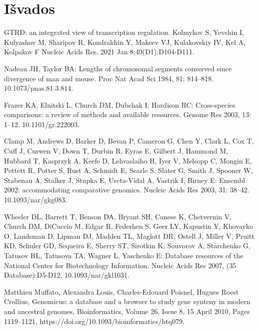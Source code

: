 \documentclass[12pt]{article}
\begin{document}
\newpage


\section{Išvados}

\newpage



\begin{thebibliography}{99}

 GTRD: an integrated view of transcription regulation.
Kolmykov S, Yevshin I, Kulyashov M, Sharipov R, Kondrakhin Y, Makeev VJ,
Kulakovskiy IV, Kel A, Kolpakov F Nucleic Acids Res. 2021 Jan
8;49(D1):D104-D111.

 Nadeau JH, Taylor BA: Lengths of chromosomal segments
conserved since divergence of man and mouse. Proc Nat Acad Sci 1984,
81: 814–818. 10.1073/pnas.81.3.814.

 Frazer KA, Elnitski L, Church DM, Dubchak I, Hardison RC:
Cross-species comparisons: a review of methods and available resources.
Genome Res 2003, 13: 1–12. 10.1101/gr.222003.

 Clamp M, Andrews D, Barker D, Bevan P, Cameron G, Chen Y,
Clark L, Cox T, Cuff J, Curwen V, Down T, Durbin R, Eyras E, Gilbert J,
Hammond M, Hubbard T, Kasprzyk A, Keefe D, Lehvaslaiho H, Iyer V, Melsopp C,
Mongin E, Pettett R, Potter S, Rust A, Schmidt E, Searle S, Slater G, Smith J,
Spooner W, Stabenau A, Stalker J, Stupka E, Ureta-Vidal A, Vastrik I, Birney E:
Ensembl 2002: accommodating comparative genomics. Nucleic Acids Res 2003,
31: 38–42. 10.1093/nar/gkg083.

 Wheeler DL, Barrett T, Benson DA, Bryant SH, Canese K,
Chetvernin V, Church DM, DiCuccio M, Edgar R, Federhen S, Geer LY, Kapustin Y,
Khovayko O, Landsman D, Lipman DJ, Madden TL, Maglott DR, Ostell J, Miller V,
Pruitt KD, Schuler GD, Sequeira E, Sherry ST, Sirotkin K, Souvorov A,
Starchenko G, Tatusov RL, Tatusova TA, Wagner L, Yaschenko E: Database
resources of the National Center for Biotechnology Information. Nucleic Acids
Res 2007, (35 Database):D5-D12. 10.1093/nar/gkl1031.

 Matthieu Muffato, Alexandra Louis, Charles-Edouard Poisnel,
Hugues Roest Crollius, Genomicus: a database and a browser to study gene
synteny in modern and ancestral genomes, Bioinformatics, Volume 26, Issue 8,
15 April 2010, Pages 1119–1121, https://doi.org/10.1093/bioinformatics/btq079.


\end{thebibliography}
\end{document}
